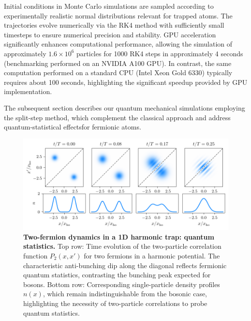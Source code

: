Initial conditions in Monte Carlo simulations are sampled according to experimentally realistic normal distributions relevant for trapped atoms. The trajectories evolve numerically via the RK4 method with sufficiently small timesteps to ensure numerical precision and stability. GPU acceleration significantly enhances computational performance, allowing the simulation of approximately $1.6 \times 10^6$ particles for 1000 RK4 steps in approximately 4 seconds (benchmarking performed on an NVIDIA A100 GPU). In contrast, the same computation performed on a standard CPU (Intel Xeon Gold 6330) typically requires about 100 seconds, highlighting the significant speedup provided by GPU implementation. 

The subsequent section describes our quantum mechanical simulations employing the split-step method, which complement the classical approach and address quantum-statistical effectsfor fermionic atoms.



\begin{figure}
    \centering
    \includegraphics{fig-py/interference.pdf}
    \caption{
        \textbf{Two-fermion dynamics in a 1D harmonic trap: quantum statistics.}
        Top row: Time evolution of the two-particle correlation function $P_2(x,x')$ for two fermions in a harmonic potential. The characteristic anti-bunching dip along the diagonal reflects fermionic quantum statistics, contrasting the bunching peak expected for bosons. Bottom row: Corresponding single-particle density profiles $n(x)$, which remain indistinguishable from the bosonic case, highlighting the necessity of two-particle correlations to probe quantum statistics.
        }
    \label{fig:interference}
\end{figure}



